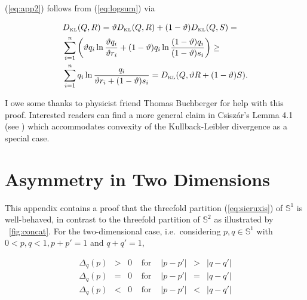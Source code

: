 \documentclass[phd,12pt,oneside]{ubcthesis}
\begin{document}
{\noindent}(\ref{eq:app2}) follows from (\ref{eq:logsum}) via

\begin{align}
  \label{eq:app3}
  &D_{\mbox{\tiny KL}}(Q,R)=\vartheta{}D_{\mbox{\tiny KL}}(Q,R)+(1-\vartheta)D_{\mbox{\tiny KL}}(Q,S)=\notag \\
  &\sum_{i=1}^{n}\left(\vartheta{}q_{i}\ln\frac{\vartheta{}q_{i}}{\vartheta{}r_{i}}+(1-\vartheta)q_{i}\ln\frac{(1-\vartheta)q_{i}}{(1-\vartheta)s_{i}}\right)\geq\notag \\
  &\sum_{i=1}^{n}q_{i}\ln\frac{q_{i}}{\vartheta{}r_{i}+(1-\vartheta)s_{i}}=D_{\mbox{\tiny KL}}(Q,\vartheta{}R+(1-\vartheta)S).
\end{align}

I owe some thanks to physicist friend Thomas Buchberger for help with
this proof. Interested readers can find a more general claim in
Csisz{\'a}r's Lemma 4.1 (see ) which
accommodates convexity of the Kullback-Leibler divergence as a special
case.

\chapter{Asymmetry in Two Dimensions}
\label{app:asytwodims}


This appendix contains a proof that the threefold partition
(\ref{eq:sieruxis}) of $\mathbb{S}^{1}$ is well-behaved, in contrast
to the threefold partition of $\mathbb{S}^{2}$ as illustrated by
{\igure}~\ref{fig:concat}. For the two-dimensional case, i.e.\
considering $p,q\in\mathbb{S}^{1}$ with $0<p,q<1, p+p'=1$ and
$q+q'=1$,


\begin{equation}
  \label{eq:twodims}
  \begin{array}{rclcrcl}
  \Delta_{q}(p)&>&0&\mbox{ for }&|p-p'|&>&|q-q'|\\
  \Delta_{q}(p)&=&0&\mbox{ for }&|p-p'|&=&|q-q'|\\
  \Delta_{q}(p)&<&0&\mbox{ for }&|p-p'|&<&|q-q'|
  \end{array}
\end{equation}
\end{document}
